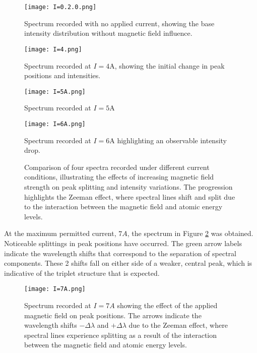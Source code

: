 \documentclass[11pt,twocolumn, a4paper]{article}
\numberwithin{equation}{section} %
\numberwithin{figure}{section} %
\numberwithin{table}{section} %
\begin{document}
\begin{figure}[H]
    \centering
    \begin{minipage}{0.48\textwidth}
        \centering
        \texttt{[image: I=0.2.0.png]}
        \caption{Spectrum recorded with no applied current, showing the base intensity distribution without magnetic field influence. }
        \label{fig:spectrum1}
    \end{minipage}
    \hfill
    \begin{minipage}{0.48\textwidth}
        \centering
        \texttt{[image: I=4.png]}
        \caption{Spectrum recorded at \(I=4\)A, showing the initial change in peak positions and intensities.}
        \label{fig:spectrum2}
    \end{minipage}
    
    \vspace{0.5cm} %
    
    \begin{minipage}{0.48\textwidth}
        \centering
        \texttt{[image: I=5A.png]}
        \caption{Spectrum recorded at \(I=5\)A}
        \label{fig:spectrum3}
    \end{minipage}
    \hfill
    \begin{minipage}{0.48\textwidth}
        \centering
        \texttt{[image: I=6A.png]}
        \caption{Spectrum recorded at \(I=6\)A highlighting an observable intensity drop.}
        \label{fig:spectrum4}
    \end{minipage}
    \caption{Comparison of four spectra recorded under different current conditions, illustrating the effects of increasing magnetic field strength on peak splitting and intensity variations. The progression highlights the Zeeman effect, where spectral lines shift and split due to the interaction between the magnetic field and atomic energy levels. }
    \label{fig:five_spectra_grid}
\end{figure}

At the maximum permitted current, $7A$, the spectrum in Figure \ref{fig:7A} was obtained. Noticeable splittings in peak positions have occurred. The green arrow labels indicate the wavelength shifts that correspond to the separation of spectral components. These 2 shifts fall on either side of a weaker, central peak, which is indicative of the triplet structure that is expected. 
\begin{figure}[H]
    \centering
    \texttt{[image: I=7A.png]}
    \caption{Spectrum recorded at $I=7A$ showing the effect of the applied magnetic field on peak positions. The arrows indicate the wavelength shifts \(-\Delta \lambda\) and \(+\Delta \lambda\) due to the Zeeman effect, where spectral lines experience splitting as a result of the interaction between the magnetic field and atomic energy levels. }
    \label{fig:7A}
\end{figure}
\end{document}
